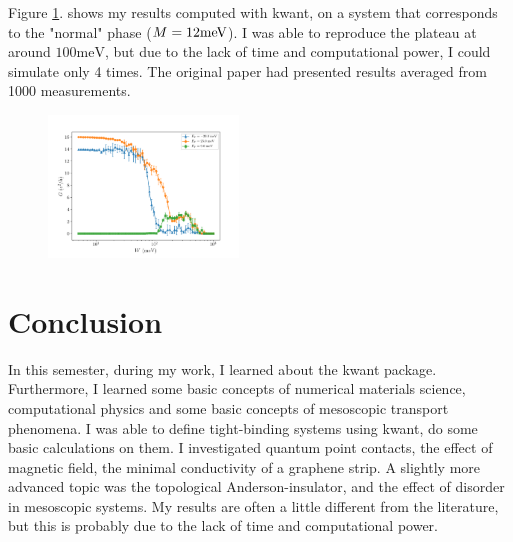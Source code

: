 \documentclass[11pt, a4paper, twocolumn]{article}
\begin{document}
Figure \ref{fig:tai_results_params1_nsamples=4}. shows my results computed with kwant, on a system that corresponds
to the "normal" phase ($M=12\textnormal{meV}$). I was able to reproduce the plateau at around $100\textrm{meV}$, but
due to the lack of time and computational power, I could simulate only 4 times. The original paper \cite{andersoninsulator}
had presented results averaged from 1000 measurements.
\begin{figure}[H]
  \begin{center}
  \includegraphics[width=0.45\textwidth]{./media/tai_results_params1_nsamples=4.png}
  \caption{}
  \label{fig:tai_results_params1_nsamples=4}
  \end{center}
\end{figure}

\section*{Conclusion}
In this semester, during my work, I learned about the kwant package. Furthermore, I learned some basic concepts
of numerical materials science, computational physics and some basic concepts of mesoscopic transport phenomena.
I was able to define tight-binding systems using kwant, do some basic calculations on them. I investigated
quantum point contacts, the effect of magnetic field, the minimal conductivity of a graphene strip.
A slightly more advanced topic was the topological Anderson-insulator, and the effect of disorder in
mesoscopic systems. My results are often a little different from the literature, but this is probably due 
to the lack of time and computational power.

\nocite{*}



\end{document}
